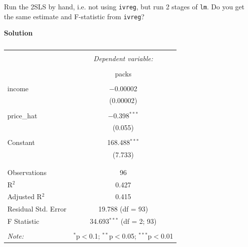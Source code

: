 \documentclass{article}
\begin{document}
Run the 2SLS by hand, i.e. not using \verb`ivreg`, but run 2 stages of \verb`lm`. Do you get the same estimate and F-statistic from \verb`ivreg`?

\textbf{Solution}

\begin{kframe}
\begin{alltt}
 \hlkwb{<-}  \hlopt{~}  \hlopt{+}   
\hlopt{$} \hlkwb{<-} 

 \hlkwb{<-}  \hlopt{~}  \hlopt{+}   
\end{alltt}
\end{kframe}
\begin{table}[!htbp] \centering 
  \caption{} 
  \label{} 
\begin{tabular}{@{\extracolsep{5pt}}lc} 
\\[-1.8ex]\hline 
\hline \\[-1.8ex] 
 & \multicolumn{1}{c}{\textit{Dependent variable:}} \\ 
\cline{2-2} 
\\[-1.8ex] & packs \\ 
\hline \\[-1.8ex] 
 income & $-$0.00002 \\ 
  & (0.00002) \\ 
  & \\ 
 price\_hat & $-$0.398$^{***}$ \\ 
  & (0.055) \\ 
  & \\ 
 Constant & 168.488$^{***}$ \\ 
  & (7.733) \\ 
  & \\ 
\hline \\[-1.8ex] 
Observations & 96 \\ 
R$^{2}$ & 0.427 \\ 
Adjusted R$^{2}$ & 0.415 \\ 
Residual Std. Error & 19.788 (df = 93) \\ 
F Statistic & 34.693$^{***}$ (df = 2; 93) \\ 
\hline 
\hline \\[-1.8ex] 
\textit{Note:}  & \multicolumn{1}{r}{$^{*}$p$<$0.1; $^{**}$p$<$0.05; $^{***}$p$<$0.01} \\ 
\end{tabular} 
\end{table} 
\end{document}
